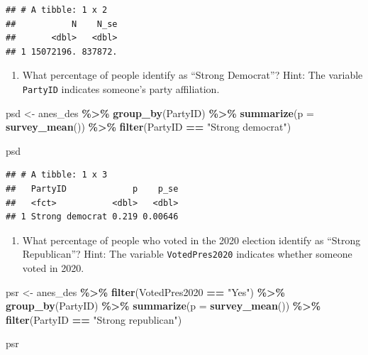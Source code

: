 \documentclass[
]{krantz}
\makeatletter
\newenvironment{Shaded}{\begin{snugshade}}{\end{snugshade}}
\newcommand{\AttributeTok}[1]{\textcolor[rgb]{0.27,0.27,0.27}{#1}}
\newcommand{\FunctionTok}[1]{\textcolor[rgb]{0.27,0.27,0.27}{\textbf{#1}}}
\newcommand{\NormalTok}[1]{#1}
\newcommand{\OtherTok}[1]{\textcolor[rgb]{0.37,0.37,0.37}{#1}}
\newcommand{\SpecialCharTok}[1]{\textcolor[rgb]{0.43,0.43,0.43}{\textbf{#1}}}
\newcommand{\StringTok}[1]{\textcolor[rgb]{0.5,0.5,0.5}{#1}}
\providecommand{\tightlist}{%
  \setlength{\itemsep}{0pt}\setlength{\parskip}{0pt}}
\newenvironment{kframe}{%
\medskip{}
\setlength{\fboxsep}{.8em}
 \def\at@end@of@kframe{}%
 \ifinner\ifhmode%
  \def\at@end@of@kframe{\end{minipage}}%
  \begin{minipage}{\columnwidth}%
 \fi\fi%
 \def\FrameCommand##1{\hskip\@totalleftmargin \hskip-\fboxsep
 \colorbox{shadecolor}{##1}\hskip-\fboxsep
     \hskip-\linewidth \hskip-\@totalleftmargin \hskip\columnwidth}%
 \MakeFramed {\advance\hsize-\width
   \@totalleftmargin\z@ \linewidth\hsize
   \@setminipage}}%
 {\par\unskip\endMakeFramed%
 \at@end@of@kframe}
\renewenvironment{Shaded}{\begin{kframe}}{\end{kframe}}
\makeatother
\begin{document}
\begin{verbatim}
## # A tibble: 1 x 2
##           N    N_se
##       <dbl>   <dbl>
## 1 15072196. 837872.
\end{verbatim}

\begin{enumerate}
\def\labelenumi{\arabic{enumi}.}
\setcounter{enumi}{1}
\tightlist
\item
  What percentage of people identify as ``Strong Democrat''? Hint: The variable \texttt{PartyID} indicates someone's party affiliation.
\end{enumerate}

\begin{Shaded}
\begin{Highlighting}[]
\NormalTok{psd }\OtherTok{\textless{}{-}}\NormalTok{ anes\_des }\SpecialCharTok{\%\textgreater{}\%}
  \FunctionTok{group\_by}\NormalTok{(PartyID) }\SpecialCharTok{\%\textgreater{}\%}
  \FunctionTok{summarize}\NormalTok{(}\AttributeTok{p =} \FunctionTok{survey\_mean}\NormalTok{()) }\SpecialCharTok{\%\textgreater{}\%}
  \FunctionTok{filter}\NormalTok{(PartyID }\SpecialCharTok{==} \StringTok{"Strong democrat"}\NormalTok{)}

\NormalTok{psd}
\end{Highlighting}
\end{Shaded}

\begin{verbatim}
## # A tibble: 1 x 3
##   PartyID             p    p_se
##   <fct>           <dbl>   <dbl>
## 1 Strong democrat 0.219 0.00646
\end{verbatim}

\begin{enumerate}
\def\labelenumi{\arabic{enumi}.}
\setcounter{enumi}{2}
\tightlist
\item
  What percentage of people who voted in the 2020 election identify as ``Strong Republican''? Hint: The variable \texttt{VotedPres2020} indicates whether someone voted in 2020.
\end{enumerate}

\begin{Shaded}
\begin{Highlighting}[]
\NormalTok{psr }\OtherTok{\textless{}{-}}\NormalTok{ anes\_des }\SpecialCharTok{\%\textgreater{}\%}
  \FunctionTok{filter}\NormalTok{(VotedPres2020 }\SpecialCharTok{==} \StringTok{"Yes"}\NormalTok{) }\SpecialCharTok{\%\textgreater{}\%}
  \FunctionTok{group\_by}\NormalTok{(PartyID) }\SpecialCharTok{\%\textgreater{}\%}
  \FunctionTok{summarize}\NormalTok{(}\AttributeTok{p =} \FunctionTok{survey\_mean}\NormalTok{()) }\SpecialCharTok{\%\textgreater{}\%}
  \FunctionTok{filter}\NormalTok{(PartyID }\SpecialCharTok{==} \StringTok{"Strong republican"}\NormalTok{)}

\NormalTok{psr}
\end{Highlighting}
\end{Shaded}
\end{document}

